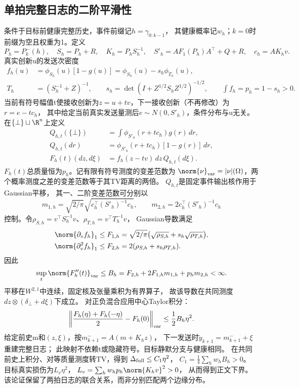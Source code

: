 \subsection{单拍完整日志的二阶平滑性}
条件于目标前健康完整历史，事件前缀记$h=\gamma_{0:k-1}$，
其健康概率记$w_h$；$k=0$时前缀为空且权重为1。定义
\[
P_h=P_k^-(h),\quad S_h=P_h+R,\quad K_h=P_hS_h^{-1},\quad
S'_h=AF_1(P_h)A^\top+Q+R,\quad c_h=AK_hv.
\]
真实创新u的发送次密度
\begin{align*}
f_h(u)&=\phi_{S_h}(u)[1-g(u)]
=\phi_{S_h}(u)-s_h\phi_{T_h}(u),\\
T_h&=(S_h^{-1}+Z)^{-1},\qquad
s_h=\det(I+Z^{1/2}S_hZ^{1/2})^{-1/2},\qquad
\int f_h=p_h=1-s_h>0.
\end{align*}
当前有符号幅值t使接收创新为$z=u+tv$，下一接收创新（不再修改）为$r=e-tc_h$，
其中给定当前真实发送量测后$e\sim N(0,S'_h)$，条件分布与u无关。
在$\{\bot\}\sqcup\R^n$上定义
\begin{align*}
Q_{h,t}(\{\bot\})&=\int\phi_{S'_h}(r+tc_h)g(r)\,dr,\\
Q_{h,t}(dr)&=\phi_{S'_h}(r+tc_h)[1-g(r)]\,dr,\\
F_h(t)(dz,d\xi)&=f_h(z-tv)\,dz\,Q_{h,t}(d\xi).
\end{align*}
$F_h(t)$总质量恒为$p_h$。记有限有符号测度的变差范数为
$\norm{\nu}_{\rm var}=|\nu|(\Omega)$，两个概率测度之差的变差范数等于其TV距离的两倍。
$Q_{h,t}$是固定事件输出核作用于Gaussian平移，
其一、二阶变差范数可分别以
\[
m_{1,h}=\sqrt{2/\pi}\sqrt{c_h^\top(S'_h)^{-1}c_h},\qquad
m_{2,h}=2c_h^\top(S'_h)^{-1}c_h
\]
控制。令$\rho_{S,h}=v^\top S_h^{-1}v$、$\rho_{T,h}=v^\top T_h^{-1}v$，
Gaussian导数满足
\begin{align*}
\norm{\partial_vf_h}_1&\le F_{1,h}
=\sqrt{2/\pi}\bigl(\sqrt{\rho_{S,h}}+s_h\sqrt{\rho_{T,h}}\bigr),\\
\norm{\partial_v^2f_h}_1&\le F_{2,h}=2(\rho_{S,h}+s_h\rho_{T,h}).
\end{align*}
因此
\[
\sup_t\norm{F_h''(t)}_{\rm var}
\le B_h=F_{2,h}+2F_{1,h}m_{1,h}+p_hm_{2,h}<\infty.
\]
平移在$W^{2,1}$中连续，固定核及张量乘积为有界算子，
故该导数在共同测度$dz\otimes(\delta_\bot+d\xi)$下成立。
对正负混合应用中心Taylor积分：
\[
\left\|\frac{F_h(\eta)+F_h(-\eta)}2-F_h(0)\right\|_{\rm var}
\le\frac12B_h\eta^2.
\]
给定前史m和$(z,\xi)$，按$m_{k+1}^-=A(m+K_hz)$，
下一发送时$\tilde y_{k+1}=m_{k+1}^-+\xi$重建完整日志；
此映射不依赖t或隐藏符号。目标静默分支与健康相同。
在共同前史上积分、对等质量测度转TV，得到
$\Delta_{\rm full}\le C_1\eta^2$，
$C_1=\frac14\sum_hw_hB_h>0$。
目标真实损伤为$L_v\eta^2$，
$L_v=\sum_hw_hp_h\norm{K_hv}^2>0$，
从而得到正文下界。该论证保留了两拍日志的联合关系，而非分别匹配两个边缘分布。

